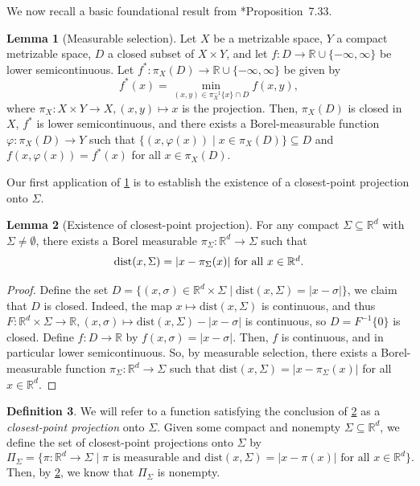 \documentclass[preprint, reqno]{amsart}
\newcommand{\dist}{\mathrm{dist}}
\theoremstyle{definition}
\newtheorem{definition}{Definition}[section]
\newtheorem{lemma}[definition]{Lemma}
\numberwithin{equation}{section}
\begin{document}
We now recall a basic foundational result from
\cite{Bertsekas78}*{Proposition~7.33}.
\begin{lemma}[Measurable selection]\label{lemma:measurableselection}
  Let $X$ be a metrizable space, $Y$ a compact metrizable space, $D$ a
  closed subset of $X \times Y$, and let $f : D \to \mathbb{R} \cup
  \{- \infty, \infty\}$ be lower semicontinuous. Let $f^*: \pi_X(D)
  \to \mathbb{R}\cup \{- \infty, \infty\}$ be given by
  \[
    f^*(x) = \min_{(x, y) \in \pi_X^{-1}\{x\} \cap D}f(x, y),
  \]
  where $\pi_X: X \times Y \to X, (x, y) \mapsto x$ is the projection.
  Then, $\pi_X(D)$ is closed in $X$, $f^*$ is lower semicontinuous,
  and there exists a Borel-measurable function $\varphi: \pi_X(D) \to
  Y$ such that $\{(x, \varphi(x)) \mid x \in \pi_X(D)\} \subseteq D$
  and $f(x, \varphi(x)) = f^*(x)$ for all $x \in \pi_X(D)$.
\end{lemma}
Our first application of \cref{lemma:measurableselection} is to
establish the existence of a closest-point projection onto $\Sigma$.
\begin{lemma}[Existence of closest-point
  projection]\label{lemma:closestpointprojectionexistence}
  For any compact $\Sigma \subseteq \mathbb{R}^d$ with $\Sigma \ne
  \emptyset$, there exists a Borel measurable $\pi_{\Sigma}:
  \mathbb{R}^d \to \Sigma$ such that
  \begin{align*}
    \hbox{$\dist(x, \Sigma) = | x - \pi_{\Sigma}(x)|$ for all $x \in
    \mathbb{R}^d$.}
  \end{align*}
\end{lemma}
\begin{proof}
  Define the set $D = \{(x, \sigma) \in \mathbb{R}^d \times \Sigma
  \mid \dist(x, \Sigma) = |x - \sigma|\}$, we claim that $D$ is
  closed. Indeed, the map $x \mapsto \dist(x, \Sigma)$ is continuous,
  and thus $F: \mathbb{R}^d \times \Sigma \to \mathbb{R}, (x, \sigma)
  \mapsto \dist(x, \Sigma) - |x - \sigma|$ is continuous, so $D =
  F^{-1}\{0\}$ is closed. Define $f : D \to \mathbb{R}$ by $f(x,
  \sigma) = |x - \sigma|$. Then, $f$ is continuous, and in particular
  lower semicontinuous. So, by measurable selection, there exists a
  Borel-measurable function $\pi_{\Sigma}: \mathbb{R}^d \to \Sigma$
  such that $\dist(x, \Sigma) = |x - \pi_{\Sigma}(x)|$ for all $x \in
  \mathbb{R}^d$.
\end{proof}

\begin{definition}\label{def:closest-proj}
  We will refer to a function satisfying the conclusion of
  \cref{lemma:closestpointprojectionexistence} as a
  \textit{closest-point projection} onto $\Sigma$. Given some compact
  and nonempty $\Sigma \subseteq \mathbb{R}^d$, we define the set of
  closest-point projections onto $\Sigma$ by
  \[
    \Pi_{\Sigma} = \{\pi : \mathbb{R}^d \to \Sigma \mid \pi \text{ is
      measurable and }\dist(x, \Sigma) = |x - \pi(x)| \text{ for all
    }x \in \mathbb{R}^d \}.
  \]
  Then, by \cref{lemma:closestpointprojectionexistence}, we know that
  $\Pi_{\Sigma}$ is nonempty.
\end{definition}
\end{document}

